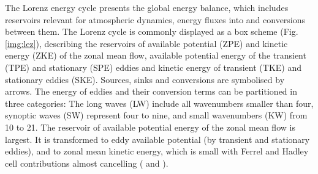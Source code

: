 \documentclass[12pt,a4paper,twoside,openright,headinclude,liststotoc,bibtotoc]{scrreprt}
\begin{document}
The Lorenz energy cycle presents the global energy balance, which includes reservoirs relevant for atmospheric dynamics, energy  fluxes into and conversions between them. The Lorenz cycle is commonly displayed as a box scheme (Fig. \ref{img:lez}), describing the reservoirs of available potential (ZPE) and  kinetic energy (ZKE) of the zonal mean flow, available potential energy of the transient (TPE) and stationary (SPE) eddies and kinetic energy of transient (TKE) and stationary eddies (SKE). Sources, sinks and conversions are symbolised by arrows. The energy of eddies and their conversion terms can be partitioned in three categories: The long waves (LW) include all wavenumbers smaller than four, synoptic waves (SW) represent four to nine, and small wavenumbers (KW) from 10 to 21. The reservoir of available potential energy of the zonal mean flow is largest. It is transformed to eddy available potential (by transient and stationary eddies), and to zonal mean kinetic energy, which is small with Ferrel and Hadley cell %
contributions almost cancelling (\citet[p. 383]{Peixoto1993} and \citet[p. 341]{Holton1992}).
\end{document}
